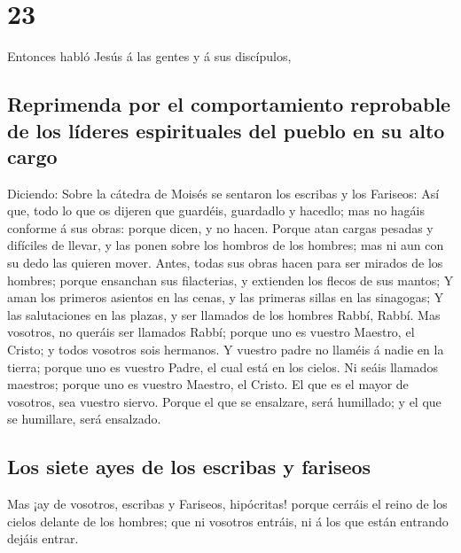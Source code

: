 \hypertarget{section-22}{%
\section{23}\label{section-22}}

 Entonces habló Jesús á las gentes y á sus discípulos,

\hypertarget{reprimenda-por-el-comportamiento-reprobable-de-los-luxedderes-espirituales-del-pueblo-en-su-alto-cargo}{%
\subsection{Reprimenda por el comportamiento reprobable de los líderes
espirituales del pueblo en su alto
cargo}\label{reprimenda-por-el-comportamiento-reprobable-de-los-luxedderes-espirituales-del-pueblo-en-su-alto-cargo}}

 Diciendo: Sobre la cátedra de Moisés se sentaron los
escribas y los Fariseos:  Así que, todo lo que os dijeren
que guardéis, guardadlo y hacedlo; mas no hagáis conforme á sus obras:
porque dicen, y no hacen.  Porque atan cargas pesadas y
difíciles de llevar, y las ponen sobre los hombros de los hombres; mas
ni aun con su dedo las quieren mover.  Antes, todas sus
obras hacen para ser mirados de los hombres; porque ensanchan sus
filacterias, y extienden los flecos de sus mantos;  Y aman
los primeros asientos en las cenas, y las primeras sillas en las
sinagogas;  Y las salutaciones en las plazas, y ser
llamados de los hombres Rabbí, Rabbí.  Mas vosotros, no
queráis ser llamados Rabbí; porque uno es vuestro Maestro, el Cristo; y
todos vosotros sois hermanos.  Y vuestro padre no llaméis
á nadie en la tierra; porque uno es vuestro Padre, el cual está en los
cielos.  Ni seáis llamados maestros; porque uno es
vuestro Maestro, el Cristo.  El que es el mayor de
vosotros, sea vuestro siervo.  Porque el que se
ensalzare, será humillado; y el que se humillare, será ensalzado.

\hypertarget{los-siete-ayes-de-los-escribas-y-fariseos}{%
\subsection{Los siete ayes de los escribas y
fariseos}\label{los-siete-ayes-de-los-escribas-y-fariseos}}

 Mas ¡ay de vosotros, escribas y Fariseos, hipócritas!
porque cerráis el reino de los cielos delante de los hombres; que ni
vosotros entráis, ni á los que están entrando dejáis entrar.

